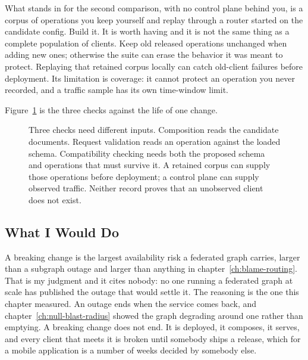 %
What stands in for the second comparison, with no control plane behind you, is
a corpus of operations you keep yourself and replay through a router started on
the candidate config. Build it. It is worth having and it is not the same
thing as a complete population of clients. Keep old released operations
unchanged when adding new ones; otherwise the suite can erase the behavior
it was meant to protect. Replaying that retained corpus locally can catch
old-client failures before deployment. Its limitation is coverage: it cannot
protect an operation you never recorded, and a traffic sample has its own
time-window limit.

%
Figure~\ref{fig:ch16-what-each-check-can-see} is the three checks against the
life of one change.

\begin{figure}[htbp]
  \centering
  
  \caption{Three checks need different inputs. Composition reads the candidate
  documents. Request validation reads an operation against the loaded schema.
  Compatibility checking needs both the proposed schema and operations that
  must survive it. A retained corpus can supply those operations before
  deployment; a control plane can supply observed traffic. Neither record
  proves that an unobserved client does not exist.}
  \label{fig:ch16-what-each-check-can-see}
\end{figure}

\subsection{What I Would Do}

%
A breaking change is the largest availability risk a federated graph carries,
larger than a subgraph outage and larger than anything in
chapter~\ref{ch:blame-routing}. That is my judgment and it cites nobody: no one
running a federated graph at scale has published the outage that would settle
it. The reasoning is the one this chapter measured. An outage ends when the
service comes back, and
chapter~\ref{ch:null-blast-radius} showed the graph degrading around one rather
than emptying. A breaking change does not end. It is deployed, it composes,
it serves, and every client that meets it is broken until somebody ships a
release, which for a mobile application is a number of weeks decided by
somebody else.

